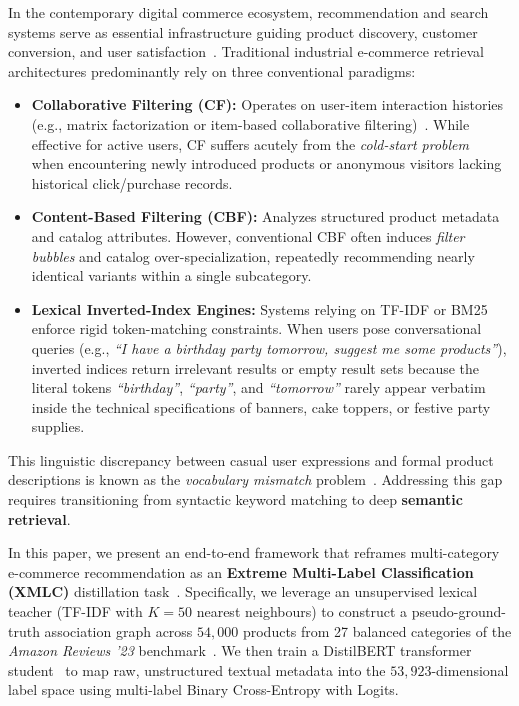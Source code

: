 \documentclass[11pt]{article}
\begin{document}
In the contemporary digital commerce ecosystem, recommendation and search systems serve as essential infrastructure guiding product discovery, customer conversion, and user satisfaction~\cite{covington2016}. Traditional industrial e-commerce retrieval architectures predominantly rely on three conventional paradigms:
\begin{itemize}
  \item \textbf{Collaborative Filtering (CF):} Operates on user-item interaction histories (e.g., matrix factorization or item-based collaborative filtering)~\cite{koren2009,sarwar2001}. While effective for active users, CF suffers acutely from the \emph{cold-start problem}~\cite{schein2002} when encountering newly introduced products or anonymous visitors lacking historical click/purchase records.
  \item \textbf{Content-Based Filtering (CBF):} Analyzes structured product metadata and catalog attributes. However, conventional CBF often induces \emph{filter bubbles} and catalog over-specialization, repeatedly recommending nearly identical variants within a single subcategory.
  \item \textbf{Lexical Inverted-Index Engines:} Systems relying on TF-IDF or BM25 enforce rigid token-matching constraints. When users pose conversational queries (e.g., \textit{``I have a birthday party tomorrow, suggest me some products''}), inverted indices return irrelevant results or empty result sets because the literal tokens \textit{``birthday''}, \textit{``party''}, and \textit{``tomorrow''} rarely appear verbatim inside the technical specifications of banners, cake toppers, or festive party supplies.
\end{itemize}

This linguistic discrepancy between casual user expressions and formal product descriptions is known as the \emph{vocabulary mismatch} problem~\cite{furnas1987,tfidf,bm25}. Addressing this gap requires transitioning from syntactic keyword matching to deep \textbf{semantic retrieval}.

In this paper, we present an end-to-end framework that reframes multi-category e-commerce recommendation as an \textbf{Extreme Multi-Label Classification (XMLC)} distillation task~\cite{fastxml,xmlc,hinton2015}. Specifically, we leverage an unsupervised lexical teacher (TF-IDF with $K = 50$ nearest neighbours) to construct a pseudo-ground-truth association graph across $54{,}000$ products from 27 balanced categories of the \textit{Amazon Reviews '23} benchmark~\cite{amazon}. We then train a DistilBERT transformer student~\cite{distilbert} to map raw, unstructured textual metadata into the $53{,}923$-dimensional label space using multi-label Binary Cross-Entropy with Logits.
\end{document}
